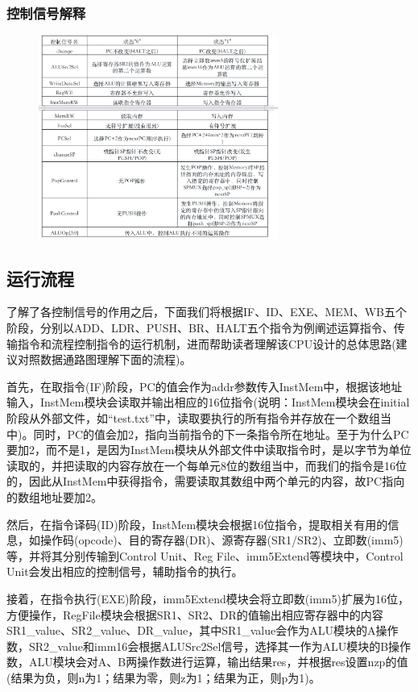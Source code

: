 \documentclass{article}
\begin{document}
\subsubsection{控制信号解释}
    \begin{figure}[H]
        \centering
        \includegraphics[width=0.7\textwidth]{pic/9.png}
        \end{figure}

\subsection{运行流程}
了解了各控制信号的作用之后，下面我们将根据IF、ID、EXE、MEM、WB五个阶段，分别以ADD、LDR、PUSH、BR、HALT五个指令为例阐述运算指令、传输指令和流程控制指令的运行机制，进而帮助读者理解该CPU设计的总体思路(建议对照数据通路图理解下面的流程)。

首先，在取指令(IF)阶段，PC的值会作为addr参数传入InstMem中，根据该地址输入，InstMem模块会读取并输出相应的16位指令(说明：InstMem模块会在initial阶段从外部文件，如“test.txt”中，读取要执行的所有指令并存放在一个数组当中)。同时，PC的值会加2，指向当前指令的下一条指令所在地址。至于为什么PC要加2，而不是1，是因为InstMem模块从外部文件中读取指令时，是以字节为单位读取的，并把读取的内容存放在一个每单元8位的数组当中，而我们的指令是16位的，因此从InstMem中获得指令，需要读取其数组中两个单元的内容，故PC指向的数组地址要加2。

然后，在指令译码(ID)阶段，InstMem模块会根据16位指令，提取相关有用的信息，如操作码(opcode)、目的寄存器(DR)、源寄存器(SR1/SR2)、立即数(imm5)等，并将其分别传输到Control Unit、Reg File、imm5Extend等模块中，Control Unit会发出相应的控制信号，辅助指令的执行。

接着，在指令执行(EXE)阶段，imm5Extend模块会将立即数(imm5)扩展为16位，方便操作，RegFile模块会根据SR1、SR2、DR的值输出相应寄存器中的内容SR1\_value、SR2\_value、DR\_value，其中SR1\_value会作为ALU模块的A操作数，SR2\_value和imm16会根据ALUSrc2Sel信号，选择其一作为ALU模块的B操作数，ALU模块会对A、B两操作数进行运算，输出结果res，并根据res设置nzp的值(结果为负，则n为1；结果为零，则z为1；结果为正，则p为1)。
\end{document}
